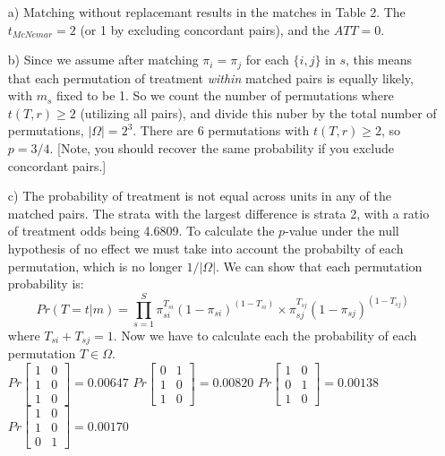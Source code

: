 \documentclass{article}
\begin{document}
\begin{itemize}
\begin{itemize}
\item[a)] Matching without replacemant results in the matches
  in Table 2.  The $t_{McNemar} = 2$ (or 1 by excluding concordant pairs), and the $ATT=0$.
\item[b)] Since we assume after matching $\pi_i = \pi_j$ for each
  $\{i,j\}$ in $s$, this means that each permutation of treatment {\em
  within} matched pairs is equally likely, with $m_s$ fixed to be 1.  So we count the number of permutations
where $t(T,r)\geq 2$ (utilizing all pairs), and divide this nuber by the total number of
permutations, $|\Omega|=2^3$.  There are 6 permutations with
$t(T,r)\geq2$, so $p=3/4$. [Note, you should recover the same
probability if you exclude concordant pairs.]
\item[c)] The probability of treatment is not equal across units in
  any of the matched pairs.  The strata with the largest difference is
  strata 2, with a ratio of treatment odds being 4.6809.  To
  calculate the $p$-value under the null hypothesis of no effect we
  must take into account the probabilty of each permutation, which is
no  longer $1/|\Omega|$.  We can show that each permutation
probability is: 
$$Pr(T=t|m)=\prod_{s=1}^S \pi_{si}^{T_{si}}(1-\pi_{si})^{(1-T_{si})}
\times \pi_{sj}^{T_{sj}}(1-\pi_{sj})^{(1-T_{sj})}$$
where $T_{si}+T_{sj}=1$.  Now we have to calculate each the
probability of each permutation $T\in\Omega$.\\

$Pr \left[ \begin{smallmatrix} 1&0 \\ 1&0 \\   1&0  \end{smallmatrix}\right] = 0.00647 $ \hspace{2em}
$Pr \left[ \begin{smallmatrix} 0&1 \\ 1&0 \\   1&0  \end{smallmatrix}\right] = 0.00820 $ \hspace{2em}
$Pr \left[ \begin{smallmatrix} 1&0 \\ 0&1 \\   1&0  \end{smallmatrix}\right] = 0.00138 $ \hspace{2em}
$Pr \left[ \begin{smallmatrix} 1&0 \\ 1&0 \\   0&1  \end{smallmatrix}\right] = 0.00170 $ \hspace{2em}\vspace{1em}


\end{itemize}
\end{itemize}
\end{document}
